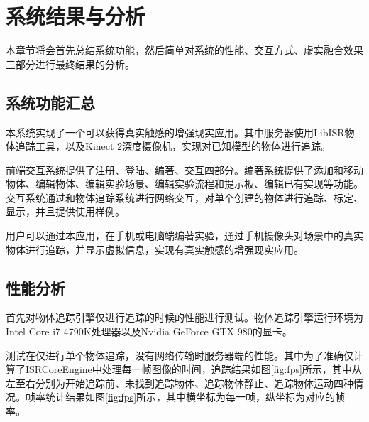 \chapter{系统结果与分析}
\label{result}

本章节将会首先总结系统功能，然后简单对系统的性能、交互方式、虚实融合效果三部分进行最终结果的分析。

\section{系统功能汇总}
本系统实现了一个可以获得真实触感的增强现实应用。其中服务器使用LibISR物体追踪工具，以及Kinect 2深度摄像机，实现对已知模型的物体进行追踪。

前端交互系统提供了注册、登陆、编著、交互四部分。编著系统提供了添加和移动物体、编辑物体、编辑实验场景、编辑实验流程和提示板、编辑已有实现等功能。交互系统通过和物体追踪系统进行网络交互，对单个创建的物体进行追踪、标定、显示，并且提供使用样例。

用户可以通过本应用，在手机或电脑端编著实验，通过手机摄像头对场景中的真实物体进行追踪，并显示虚拟信息，实现有真实触感的增强现实应用。

\section{性能分析}

首先对物体追踪引擎仅进行追踪的时候的性能进行测试。物体追踪引擎运行环境为Intel Core i7 4790K处理器以及Nvidia GeForce GTX 980的显卡。

测试在仅进行单个物体追踪，没有网络传输时服务器端的性能。其中为了准确仅计算了ISRCoreEngine中处理每一帧图像的时间，追踪结果如图\ref{fig:fps}所示，其中从左至右分别为开始追踪前、未找到追踪物体、追踪物体静止、追踪物体运动四种情况。帧率统计结果如图\ref{fig:fps}所示，其中横坐标为每一帧，纵坐标为对应的帧率。

